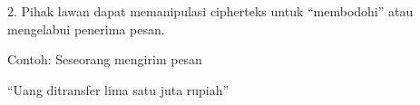 \documentclass{article}
\begin{document}

2. Pihak lawan dapat memanipulasi cipherteks untuk ``membodohi'' atau mengelabui penerima pesan.

Contoh: Seseorang mengirim pesan

``Uang ditransfer lima satu juta rupiah''
\end{document}
